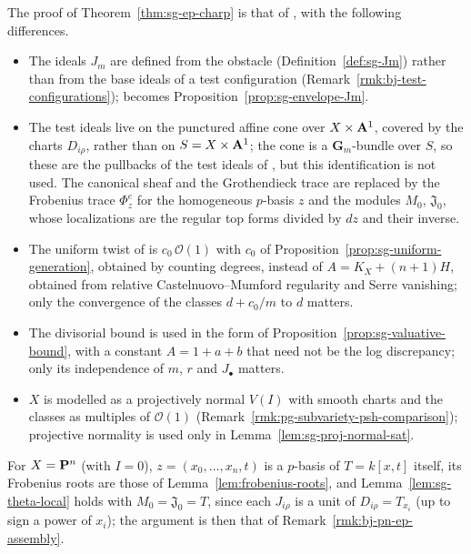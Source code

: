 \begin{remark}\label{rmk:sg-source}
The proof of Theorem~\ref{thm:sg-ep-charp} is that of \cite[\S3]{FHX}, with the following differences.
\begin{itemize}
\item The ideals $J_m$ are defined from the obstacle (Definition~\ref{def:sg-Jm}) rather than from the base ideals of a test configuration
(Remark~\ref{rmk:bj-test-configurations}); \cite[Proposition~2.5(2)]{FHX} becomes Proposition~\ref{prop:sg-envelope-Jm}.
\item The test ideals live on the punctured affine cone over $X\times\mathbf{A}^1$, covered by the charts $D_{i\rho}$, rather than on
$S=X\times\mathbf{A}^1$; the cone is a $\mathbf G_m$-bundle over $S$, so these are the pullbacks of the test ideals of \cite{FHX}, but this
identification is not used. The canonical sheaf and the Grothendieck trace are replaced by the Frobenius trace $\Phi^e_z$ for the homogeneous
$p$-basis $z$ and the modules $M_0$, $\mathfrak J_0$, whose localizations are the regular top forms divided by $dz$ and their inverse.
\item The uniform twist of \cite[Lemma~3.2]{FHX} is $c_0\,\mathcal O(1)$ with $c_0$ of Proposition~\ref{prop:sg-uniform-generation}, obtained by counting
degrees, instead of $A=K_X+(n+1)H$, obtained from relative Castelnuovo--Mumford regularity and Serre vanishing; only the convergence of the
classes $d+c_0/m$ to $d$ matters.
\item The divisorial bound \cite[Lemma~3.3]{FHX} is used in the form of Proposition~\ref{prop:sg-valuative-bound}, with a constant $A=1+a+b$ that need
not be the log discrepancy; only its independence of $m$, $r$ and $J_\bullet$ matters.
\item $X$ is modelled as a projectively normal $V(I)$ with smooth charts and the classes as multiples of $\mathcal O(1)$
(Remark~\ref{rmk:pg-subvariety-psh-comparison}); projective normality is used only in Lemma~\ref{lem:sg-proj-normal-sat}.
\end{itemize}
For $X=\mathbf{P}^n$ (with $I=0$), $z=(x_0,\dots,x_n,t)$ is a $p$-basis of $T=k[x,t]$ itself, its Frobenius roots are those of
Lemma~\ref{lem:frobenius-roots}, and Lemma~\ref{lem:sg-theta-local} holds with $M_0=\mathfrak J_0=T$, since each $J_{i\rho}$ is a unit of $D_{i\rho}=T_{x_i}$ (up to
sign a power of $x_i$); the argument is then that of Remark~\ref{rmk:bj-pn-ep-assembly}.
\end{remark}

